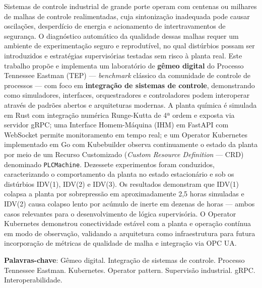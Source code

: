 \begin{resumo}[RESUMO]
\vspace*{-6mm}

Sistemas de controle industrial de grande porte operam com centenas ou milhares de malhas de controle realimentadas, cuja sintonização inadequada pode causar oscilações, desperdício de energia e acionamento de intertravamentos de segurança. O diagnóstico automático da qualidade dessas malhas requer um ambiente de experimentação seguro e reprodutível, no qual distúrbios possam ser introduzidos e estratégias supervisórias testadas sem risco à planta real. Este trabalho propõe e implementa um laboratório de \textbf{gêmeo digital} do Processo Tennessee Eastman (TEP) — \textit{benchmark} clássico da comunidade de controle de processos — com foco em \textbf{integração de sistemas de controle}, demonstrando como simuladores, interfaces, orquestradores e controladores podem interoperar através de padrões abertos e arquiteturas modernas. A planta química é simulada em Rust com integração numérica Runge-Kutta de 4ª ordem e exposta via servidor gRPC; uma Interface Homem-Máquina (IHM) em FastAPI com WebSocket permite monitoramento em tempo real; e um Operator Kubernetes implementado em Go com Kubebuilder observa continuamente o estado da planta por meio de um Recurso Customizado (\textit{Custom Resource Definition} — CRD) denominado \texttt{PLCMachine}. Dezessete experimentos foram conduzidos, caracterizando o comportamento da planta no estado estacionário e sob os distúrbios IDV(1), IDV(2) e IDV(3). Os resultados demonstram que IDV(1) colapsa a planta por sobrepressão em aproximadamente 2,5 horas simuladas e IDV(2) causa colapso lento por acúmulo de inerte em dezenas de horas — ambos casos relevantes para o desenvolvimento de lógica supervisória. O Operator Kubernetes demonstrou conectividade estável com a planta e operação contínua em modo de observação, validando a arquitetura como infraestrutura para futura incorporação de métricas de qualidade de malha e integração via OPC UA.

\textbf{Palavras-chave}: Gêmeo digital. Integração de sistemas de controle. Processo Tennessee Eastman. Kubernetes. Operator pattern. Supervisão industrial. gRPC. Interoperabilidade.
\end{resumo}
